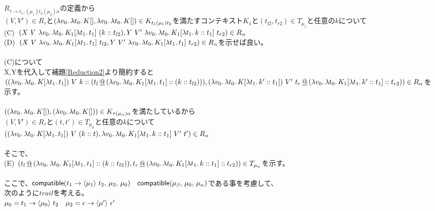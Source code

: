 $R_{\tau \rightarrow t_1, (\mu_1) t_2 (\mu_2) \alpha}$の定義から\\
$(V,V')\in R_{\tau}$と$(\Lam{v_0}{\Lam{t_0}{K[]}}, \Lam{v_0}{\Lam{t_0}{K[]}})\in K_{t_1 (\mu_1) t_2}$を満たすコンテキスト$K_1$と$(t_{l2},t_{r2})\in T_{\mu_1}$と任意の$k$について\\
(C)\ $(X\ V\ \Lam{v_0}{\Lam{t_0}{K_1[\Lam{t_1}{t_1}]}}\ \ConsP{k}{t_{l2}},Y\ V'\ \Lam{v_0}{\Lam{t_0}{K_1[\Lam{t_1}{\Cons{k}{t_1}}]}}\ t_{r2})\in R_{\alpha}$\\
(D)\ $(X\ V\ \Lam{v_0}{\Lam{t_0}{K_1[\Lam{t_1}{t_1}]}}\ t_{l2},Y\ V'\ \Lam{v_0}{\Lam{t_0}{K_1[\Lam{t_1}{t_1}]}}\ t_{r2})\in R_{\alpha}$を示せば良い。\\
\\
(C)について\\
X,Yを代入して補題\ref{Reduction2}より簡約すると\\
$(\LamP{v_0}{\Lam{t_0}{K[\Lam{t_1}{t_1}]}}\ V\ \Cons{k}{(\DAppend{t_l}{\ConsP{\Lam{v_0}{\Lam{t_0}{K_1[\Lam{t_1}{t_1}]}}}{\ConsP{k}{t_{l2}}}}}),\\
\LamP{v_0}{\Lam{t_0}{K[\Lam{t_1}{\Cons{k'}{t_1}}]}}\ V'\ \DAppend{t_r}{\ConsP{\Lam{v_0}{\Lam{t_0}{K_1[\Lam{t_1}{\Cons{k'}{t_1}}]}}}{t_{r2}}})\in R_{\alpha}$を示す。\\
\\
$(\LamP{v_0}{\Lam{t_0}{K[]}},\LamP{v_0}{\Lam{t_0}{K[]}})\in K_{\tau(\mu_{\alpha})\alpha}$を満たしているから\\
$(V,V')\in R_{\tau}$と$(t, t')\in T_{\mu_{\alpha}}$と任意の$k$について\\
$(\LamP{v_0}{\Lam{t_0}{K[\Lam{t_1}{t_1}]}}\ V\ \ConsP{k}{t},
\Lam{v_0}{\Lam{t_0}{K_1[\Lam{t_1}{\Cons{k}{t_1}}]}}\ V'\ t')\in R_{\alpha}$\\
\\
そこで、\\
(E)\ $(\DAppend{t_l}{\ConsP{\Lam{v_0}{\Lam{t_0}{K_1[\Lam{t_1}{t_1}]}}}{\ConsP{k}{t_{l2}}}},
\DAppend{t_r}{\ConsP{\Lam{v_0}{\Lam{t_0}{K_1[\Lam{t_1}{\Cons{k}{t_1}}]}}}{t_{r2}}})\in T_{\mu_{\alpha}}$を示す。\\
\\
ここで、$\Compatible{\Trail{t_1}{t_2}{\mu_1}}{\mu_2}{\mu_0}\quad \Compatible{\mu_\beta}{\mu_0}{\mu_\alpha}$である事を考慮して、\\
次のように$trail$を考える。\\
$\mu_0 = \Trail{t_1}{t_2}{\mu_0}\quad \mu_2 = \Trail{\epsilon}{\epsilon'}{\mu'}$\\
